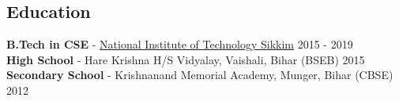 \documentclass[margin, centered]{res}
\begin{document}
\begin{resume}
    \section{Education}
    \textbf{B.Tech in CSE} -
    \href{https://www.nitsikkim.ac.in/}{National Institute of Technology Sikkim} \hfill 2015 - 2019 \\
    \textbf{High School} - Hare Krishna H/S Vidyalay, Vaishali, Bihar (BSEB) \hfill 2015 \\
    \textbf{Secondary School} - Krishnanand Memorial Academy, Munger, Bihar (CBSE) \hfill 2012


\end{resume}
\end{document}
